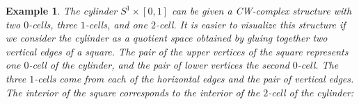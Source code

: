 \documentclass[11pt, letterpaper, oneside]{report}
\theoremstyle{pplain}
\theoremstyle{ddefinition}
\newtheorem{example}[theorem]{Example}
\theoremstyle{nnn}
\theoremstyle{eexercise}
\begin{document}
\begin{example}
The cylinder $S^{1}\times [0, 1]$ can be given a CW-complex structure with two $0$-cells, 
three $1$-cells, and one $2$-cell. It is easier to visualize this structure if we consider the cylinder 
as a quotient space obtained by gluing together two vertical edges of a square. The pair 
of the upper vertices of the square represents one $0$-cell of the cylinder, and the  pair of lower vertices 
the second  $0$-cell. The three $1$-cells come from each of the  horizontal edges and the pair of vertical 
edges. The interior of the square corresponds to the interior of the $2$-cell of the cylinder:   

\end{example}
\end{document}
